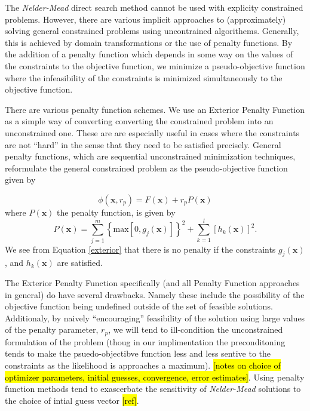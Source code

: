 \documentclass[10pt,a4paper]{article}
\begin{document}
The \emph{Nelder-Mead} direct search method cannot be used with explicity constrained problems. However, there are various implicit approaches to (approximately) solving general constrained problems using uncontrained algorithems. Generally, this is achieved by domain transformations or the use of penalty functions.  By the addition of a penalty function which depends in some way on the values of the constraints to the objective function, we minimize a pseudo-objective function where the infeasibility of the constraints is minimized simultaneously to the objective function. 

There are various penalty function schemes. We use an Exterior Penalty Function as a simple way of converting converting the constrained problem into an unconstrained one. These are are especially useful in cases where the constraints are not ``hard'' in the sense that they need to be satisfied precisely. General penalty functions, which are sequential unconstrained minimization techniques, reformulate the general constrained problem as the pseudo-objective function given by

\[ \phi(\mathbf{x}, r_p ) = F(\mathbf{x}) + r_p P(\mathbf{x}) \]
where $P \left( \mathbf{x} \right)$ the penalty function, is given by
\begin{equation} \label{exterior}
 P( \mathbf{x} ) = \sum_{j = 1}^m \left\lbrace \mbox{max} \left[ 0, g_j(\mathbf{x} ) \right] \right\rbrace^2 + 
\sum_{k = 1}^l \left[ h_k( \mathbf{x}) \right]^2 .
\end{equation}
We see from Equation \ref{exterior} that there is no penalty if the constraints $g_j(\mathbf{x})$, and $h_k(\mathbf{x})$ are satisfied.
 
The Exterior Penalty Function specifically (and all Penalty Function approaches in general) do have several drawbacks. Namely these include the possibility of the objective function being undefined outside of the set of feasible solutions. Additionaly, by naively ``encouraging'' feasibility of the solution using large values of the penalty parameter, $r_p$, we will tend to ill-condition the unconstrained formulation of the problem (thoug in our implimentation the preconditoning tends to make the psuedo-objectibve function less and less sentive to the constraints as the likelihood is approaches a maximum).
\hl{[notes on choice of optimizer parameters, initial guesses, convergence, error estimates]}. Using penalty function methods tend to exascerbate the sensitivity of \emph{Nelder-Mead} solutions to the choice of intial guess vector \hl{[ref]}.
\end{document}
